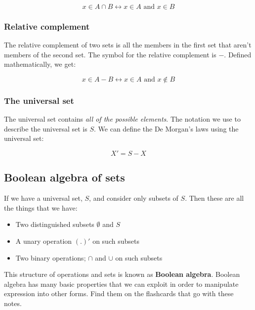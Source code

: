 \begin{dmath}
	x \in A \cap B \leftrightarrow x \in A \textrm{ and } x \in B
\end{dmath}

\subsubsection{Relative complement}

The relative complement of two sets is all the members in the first set that
aren't members of the second set. The symbol for the relative complement is $-$.
Defined mathematically, we get:

\begin{dmath}
	x \in A - B \leftrightarrow x \in A \textrm{ and } x \not\in B
\end{dmath}

\subsubsection{The universal set}
\label{subsubsec:universal_set}

The universal set contains {\it all of the possible elements}. The notation we
use to describe the universal set is $S$. We can define the De Morgan's laws
using the universal set:

\begin{dmath}
	X' = S - X
\end{dmath}

\subsection{Boolean algebra of sets}

If we have a universal set, $S$, and consider only subsets of $S$. Then these
are all the things that we have:

\begin{itemize}
	\item Two distinguished subsets $\emptyset$ and $S$
	\item A unary operation $(.)'$ on such subsets
	\item Two binary operations; $\cap$ and $\cup$ on such subsets
\end{itemize}

This structure of operations and sets is known as {\bf Boolean algebra}. Boolean
algebra has many basic properties that we can exploit in order to manipulate
expression into other forms. Find them on the flashcards that go with these
notes.


